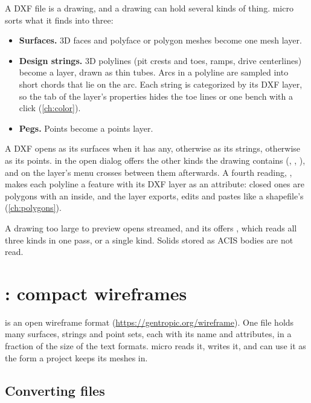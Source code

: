 A DXF file is a drawing, and a drawing can hold several kinds of thing. micro sorts what it finds into three:

\begin{itemize}
\item \textbf{Surfaces.} 3D faces and polyface or polygon meshes become one mesh layer.
\item \textbf{Design strings.} 3D polylines (pit crests and toes, ramps, drive centerlines) become a  layer, drawn as thin tubes. Arcs in a polyline are sampled into short chords that lie on the arc. Each string is categorized by its DXF layer, so the  tab of the layer's properties hides the toe lines or one bench with a click (\cref{ch:color}).
\item \textbf{Pegs.} Points become a points layer.
\end{itemize}

A DXF opens as its surfaces when it has any, otherwise as its strings, otherwise as its points.  in the open dialog offers the other kinds the drawing contains (, , ), and  on the layer's menu crosses between them afterwards. A fourth reading, , makes each polyline a feature with its DXF layer as an attribute: closed ones are polygons with an inside, and the layer exports, edits and pastes like a shapefile's (\cref{ch:polygons}).

A drawing too large to preview opens streamed, and its  offers , which reads all three kinds in one pass, or a single kind. Solids stored as ACIS bodies are not read.

\section{: compact wireframes}\label{sec:meshes-wfr}

 is an open wireframe format (\url{https://gentropic.org/wireframe}). One file holds many surfaces, strings and point sets, each with its name and attributes, in a fraction of the size of the text formats. micro reads it, writes it, and can use it as the form a project keeps its meshes in.

\subsection{Converting files}

